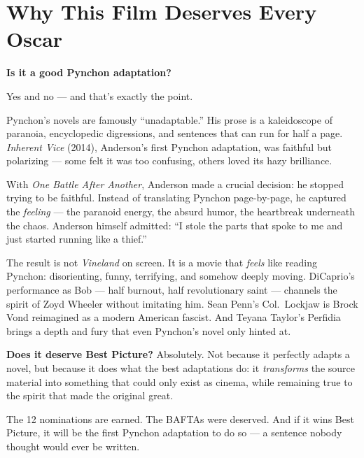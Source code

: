 \documentclass[10pt,a4paper]{article}
\begin{document}
\section*{Why This Film Deserves Every Oscar}

\begin{tcolorbox}[colback=white, colframe=black,
    title=A Pynchon Fan's Assessment]
\small
\textbf{Is it a good Pynchon adaptation?}

Yes and no --- and that's exactly the point.

Pynchon's novels are famously ``unadaptable.'' His prose is a
kaleidoscope of paranoia, encyclopedic digressions, and sentences
that can run for half a page. \emph{Inherent Vice} (2014), Anderson's
first Pynchon adaptation, was faithful but polarizing --- some felt
it was too confusing, others loved its hazy brilliance.

With \emph{One Battle After Another}, Anderson made a crucial
decision: he stopped trying to be faithful. Instead of translating
Pynchon page-by-page, he captured the \emph{feeling} --- the
paranoid energy, the absurd humor, the heartbreak underneath the
chaos. Anderson himself admitted: ``I stole the parts that spoke to
me and just started running like a thief.''

The result is not \emph{Vineland} on screen. It is a movie that
\emph{feels} like reading Pynchon: disorienting, funny, terrifying,
and somehow deeply moving. DiCaprio's performance as Bob --- half
burnout, half revolutionary saint --- channels the spirit of Zoyd
Wheeler without imitating him. Sean Penn's Col.\ Lockjaw is Brock
Vond reimagined as a modern American fascist. And Teyana Taylor's
Perfidia brings a depth and fury that even Pynchon's novel only
hinted at.

\textbf{Does it deserve Best Picture?} Absolutely. Not because it
perfectly adapts a novel, but because it does what the best
adaptations do: it \emph{transforms} the source material into
something that could only exist as cinema, while remaining true to
the spirit that made the original great.

The 12 nominations are earned. The BAFTAs were deserved. And if it
wins Best Picture, it will be the first Pynchon adaptation to do so
--- a sentence nobody thought would ever be written.
\end{tcolorbox}

\end{document}
